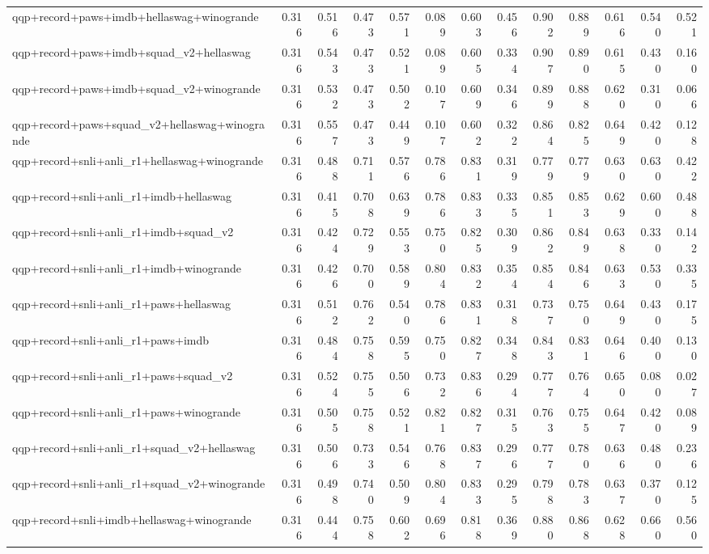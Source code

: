 \begin{table}[t]
\begin{tabular}{lrrrrrrrrrrrr}
    qqp+record+paws+imdb+hellaswag+winogrande & 0.316 & 0.516 & 0.473 & 0.571 & 0.089 & 0.603 & 0.456 & 0.902 & 0.889 & 0.616 & 0.540 & 0.521 \\
    qqp+record+paws+imdb+squad\_v2+hellaswag & 0.316 & 0.543 & 0.473 & 0.521 & 0.089 & 0.605 & 0.334 & 0.907 & 0.890 & 0.615 & 0.430 & 0.160 \\
    qqp+record+paws+imdb+squad\_v2+winogrande & 0.316 & 0.532 & 0.473 & 0.502 & 0.107 & 0.609 & 0.346 & 0.899 & 0.888 & 0.620 & 0.310 & 0.066 \\
    qqp+record+paws+squad\_v2+hellaswag+winogrande & 0.316 & 0.557 & 0.473 & 0.449 & 0.107 & 0.602 & 0.322 & 0.864 & 0.825 & 0.649 & 0.420 & 0.128 \\
    qqp+record+snli+anli\_r1+hellaswag+winogrande & 0.316 & 0.488 & 0.711 & 0.576 & 0.786 & 0.831 & 0.319 & 0.779 & 0.779 & 0.630 & 0.630 & 0.422 \\
    qqp+record+snli+anli\_r1+imdb+hellaswag & 0.316 & 0.415 & 0.708 & 0.639 & 0.786 & 0.833 & 0.335 & 0.851 & 0.853 & 0.629 & 0.600 & 0.488 \\
    qqp+record+snli+anli\_r1+imdb+squad\_v2 & 0.316 & 0.424 & 0.729 & 0.553 & 0.750 & 0.825 & 0.309 & 0.862 & 0.849 & 0.638 & 0.330 & 0.142 \\
    qqp+record+snli+anli\_r1+imdb+winogrande & 0.316 & 0.426 & 0.700 & 0.589 & 0.804 & 0.832 & 0.354 & 0.854 & 0.846 & 0.633 & 0.530 & 0.335 \\
    qqp+record+snli+anli\_r1+paws+hellaswag & 0.316 & 0.512 & 0.762 & 0.540 & 0.786 & 0.831 & 0.318 & 0.737 & 0.750 & 0.649 & 0.430 & 0.175 \\
    qqp+record+snli+anli\_r1+paws+imdb & 0.316 & 0.484 & 0.758 & 0.595 & 0.750 & 0.827 & 0.348 & 0.843 & 0.831 & 0.646 & 0.400 & 0.130 \\
    qqp+record+snli+anli\_r1+paws+squad\_v2 & 0.316 & 0.524 & 0.755 & 0.506 & 0.732 & 0.836 & 0.294 & 0.777 & 0.764 & 0.650 & 0.080 & 0.027 \\
    qqp+record+snli+anli\_r1+paws+winogrande & 0.316 & 0.505 & 0.758 & 0.521 & 0.821 & 0.827 & 0.315 & 0.763 & 0.755 & 0.647 & 0.420 & 0.089 \\
    qqp+record+snli+anli\_r1+squad\_v2+hellaswag & 0.316 & 0.506 & 0.733 & 0.546 & 0.768 & 0.837 & 0.296 & 0.777 & 0.780 & 0.636 & 0.480 & 0.236 \\
    qqp+record+snli+anli\_r1+squad\_v2+winogrande & 0.316 & 0.498 & 0.740 & 0.509 & 0.804 & 0.833 & 0.295 & 0.798 & 0.783 & 0.637 & 0.370 & 0.125 \\
    qqp+record+snli+imdb+hellaswag+winogrande & 0.316 & 0.444 & 0.758 & 0.602 & 0.696 & 0.818 & 0.369 & 0.880 & 0.868 & 0.628 & 0.660 & 0.560 \\

\end{tabular}
\end{table}
